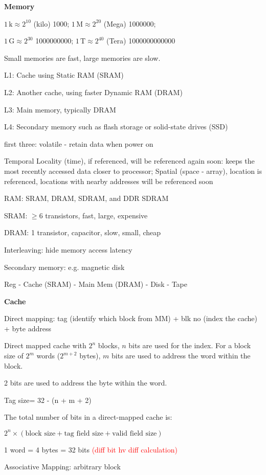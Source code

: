 \documentclass[10pt,landscape,a4paper]{article}
\begin{document}
\begin{multicols}{3}
\textbf{Memory} 

\(1\,\text{k} \approx 2^{10}\) (kilo) 1000; \(1\,\text{M} \approx 2^{20}\) (Mega) 1000000;

\(1\,\text{G} \approx 2^{30}\) 1000000000; \(1\,\text{T} \approx 2^{40}\) (Tera) 1000000000000

Small memories are fast, large memories are slow.

L1: Cache using Static RAM (SRAM)

L2: Another cache, using faster Dynamic RAM (DRAM)

L3: Main memory, typically DRAM

L4: Secondary memory such as flash storage or solid-state drives (SSD)

first three: volatile - retain data when power on

Temporal Locality (time), if referenced, will be referenced again soon: keeps the most recently accessed data closer to processor; Spatial (space - array), location is referenced, locations with nearby addresses will be referenced soon

RAM: SRAM, DRAM, SDRAM, and DDR SDRAM

SRAM: \(\geq 6\) transistors, fast, large, expensive

DRAM: 1 transistor, capacitor, slow, small, cheap

Interleaving: hide memory access latency

Secondary memory: e.g. magnetic disk

Reg - Cache (SRAM) - Main Mem (DRAM) - Disk - Tape

\textbf{Cache}

Direct mapping: tag (identify which block from MM) + blk no (index the cache) + byte address


Direct mapped cache with \(2^n\) blocks, \(n\) bits are used for the index. For a block size of \(2^m\) words (\(2^{m+2}\) bytes), \(m\) bits are used to address the word within the block.

2 bits are used to address the byte within the word.

Tag size= 32 - (n + m + 2)

The total number of bits in a direct-mapped cache is:

\(2^n \times (\text{block size} + \text{tag field size} + \text{valid field size})\)

1 word = 4 bytes = 32 bits \textcolor{red}{(diff bit hv diff calculation)}

Associative Mapping: arbitrary block 


\end{multicols}
\end{document}
